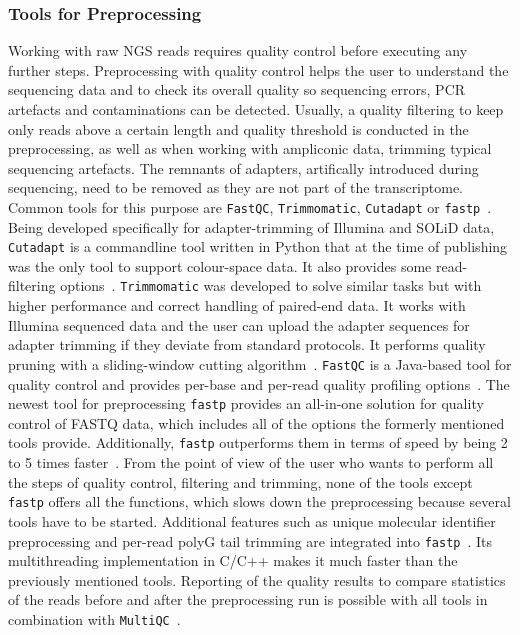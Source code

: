 \subsubsection*{Tools for Preprocessing}
Working with raw NGS reads requires quality control before executing any further steps. Preprocessing with quality control helps the user to understand the sequencing data and to check its overall quality so sequencing errors, PCR artefacts and contaminations can be detected. Usually, a quality filtering to keep only reads above a certain length and quality threshold is conducted in the preprocessing, as well as when working with ampliconic data, trimming typical sequencing artefacts. The remnants of adapters, artifically introduced during sequencing, need to be removed as they are not part of the transcriptome. Common tools for this purpose are \texttt{FastQC}, \texttt{Trimmomatic}, \texttt{Cutadapt} or \texttt{fastp}~\cite{andrews2010fastqc, bolger2014trimmomatic, martin2011cutadapt, chen2018fastp}. Being developed specifically for adapter-trimming of Illumina and SOLiD data, \texttt{Cutadapt} is a commandline tool written in Python that at the time of publishing was the only tool to support colour-space data. It also provides some read-filtering options~\cite{martin2011cutadapt}. \texttt{Trimmomatic} was developed to solve similar tasks but with higher performance and correct handling of paired-end data. It works with Illumina sequenced data and the user can upload the adapter sequences for adapter trimming if they deviate from standard protocols. It performs quality pruning with a sliding-window cutting algorithm~\cite{bolger2014trimmomatic}. \texttt{FastQC} is a Java-based tool for quality control and provides per-base and per-read quality profiling options~\cite{andrews2010fastqc}. The newest tool for preprocessing \texttt{fastp} provides an all-in-one solution for quality control of FASTQ data, which includes all of the options the formerly mentioned tools provide. Additionally, \texttt{fastp} outperforms them in terms of speed by being 2 to 5 times faster~\cite{chen2018fastp}. From the point of view of the user who wants to perform all the steps of quality control, filtering and trimming, none of the tools except \texttt{fastp} offers all the functions, which slows down the preprocessing because several tools have to be started. Additional features such as unique molecular identifier preprocessing and per-read polyG tail trimming are integrated into \texttt{fastp}~\cite{chen2018fastp}. Its multithreading implementation in C/C++ makes it much faster than the previously mentioned tools. Reporting of the quality results to compare statistics of the reads before and after the preprocessing run is possible with all tools in combination with \texttt{MultiQC}~\cite{ewels2016multiqc}.

